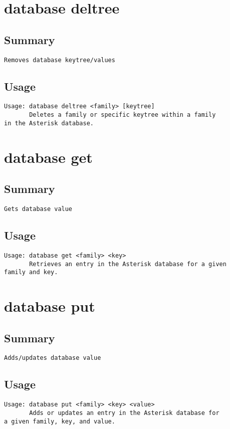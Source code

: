 \section{database deltree}
\subsection{Summary}
\begin{verbatim}
Removes database keytree/values
\end{verbatim}
\subsection{Usage}
\begin{verbatim}
Usage: database deltree <family> [keytree]
       Deletes a family or specific keytree within a family
in the Asterisk database.

\end{verbatim}


\section{database get}
\subsection{Summary}
\begin{verbatim}
Gets database value
\end{verbatim}
\subsection{Usage}
\begin{verbatim}
Usage: database get <family> <key>
       Retrieves an entry in the Asterisk database for a given
family and key.

\end{verbatim}


\section{database put}
\subsection{Summary}
\begin{verbatim}
Adds/updates database value
\end{verbatim}
\subsection{Usage}
\begin{verbatim}
Usage: database put <family> <key> <value>
       Adds or updates an entry in the Asterisk database for
a given family, key, and value.

\end{verbatim}


